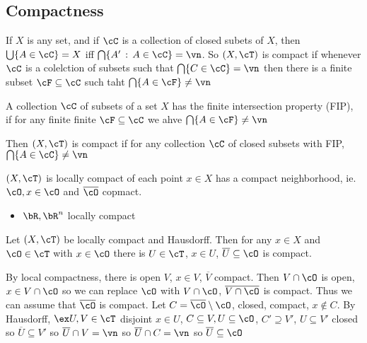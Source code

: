 
\subsection{Compactness}

If $X$ is any set, and if $\cC$ is a collection of closed subets of $X$, then $\bigcup \{ A \in \cC\} = X$ iff $\bigcap \{A' \, : \, A \in \cC\} = \vn$. So $(X, \cT)$ is compact if whenever $\cC$ is a colelction of subsets such that $\bigcap \{C \in \cC\} = \vn$ then there is a finite subset $\cF \subseteq \cC$ such taht $\bigcap\{A \in \cF\} \neq \vn$ 

\begin{definition}
    A collection $\cC$ of subsets of a set $X$ has the finite intersection property (FIP), if for any finite finite $\cF \subseteq \cC$ we ahve $\bigcap \{A \in \cF\} \neq \vn$ 
\end{definition}

\noindent
Then $(X, \cT)$ is compact if for any collection $\cC$ of closed subsets with FIP, $\bigcap\{A \in \cC\} \neq \vn$ 

\begin{definition}
    $(X, \cT)$ is locally compact of each point $x\in X$ has a compact neighborhood, ie. $\cO, x \in \cO$ and $\overline{\cO}$ copmact. 
\end{definition}

\begin{itemize}
    \item $\bR, \bR^n$ locally compact 
\end{itemize}

\begin{proposition}
    Let $(X, \cT)$ be locally compact and Hausdorff. Then for any $x \in X$ and $\cO \in \cT$ with $x \in \cO$ there is $U \in \cT$, $x \in U$, $\overline{U} \subseteq \cO$ is compact. 
\end{proposition}

\begin{pf}
    By local compactness, there is open $V$, $x \in V$, $\overline{V}$ compact. Then $V \cap \cO$ is open, $x \in V \cap \cO$ so we can replace $\cO$ with $V \cap \cO$, $\overline{V \cap \cO}$ is compact. Thus we can assume that $\overline{\cO}$ is compact. Let $C = \overline{\cO} \setminus \cO$, closed, compact, $x \not\in C$. By Hausdorff, $\ex U, V \in \cT$ disjoint $x \in U$, $C \subseteq V, U \subseteq \cO$, $C' \supseteq V'$, $U \subseteq V'$ closed so $\overline{U} \subseteq V'$ so $\overline{U} \cap V = \vn$ so $\overline{U} \cap C = \vn$ so $\overline{U} \subseteq \cO$ 
\end{pf}